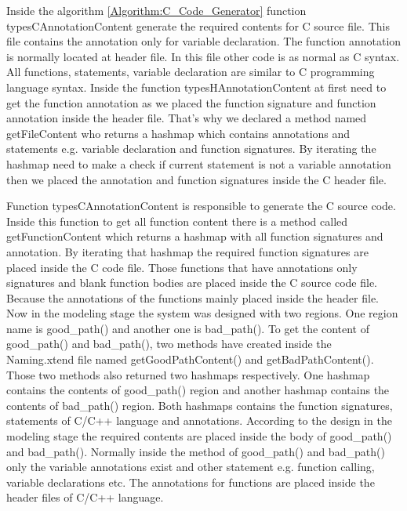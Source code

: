 Inside the algorithm \ref{Algorithm:C_Code_Generator} function typesCAnnotationContent generate the required contents for C source file. This file contains the annotation only for variable declaration. The function annotation is normally located at header file. In this file other code is as normal as C syntax. All functions, statements, variable declaration are similar to C programming language syntax. Inside the function typesHAnnotationContent at first need to get the function annotation as we placed the function signature and function annotation inside the header file. That's why we declared a method named getFileContent who returns a hashmap which contains annotations and statements e.g. variable declaration and function signatures. By iterating the hashmap need to make a check if current statement is not a variable annotation then we placed the annotation and function signatures inside the C header file.

Function typesCAnnotationContent is responsible to generate the C source code. Inside this function to get all function content there is a method called getFunctionContent which returns a hashmap with all function signatures and annotation. By iterating that hashmap the required function signatures are placed inside the C code file. Those functions that have annotations only signatures and blank function bodies are placed inside the C source code file. Because the annotations of the functions mainly placed inside the header file. Now in the modeling stage the system was designed with two regions. One region name is good\_path() and another one is bad\_path(). To get the content of good\_path() and bad\_path(), two methods have created inside the Naming.xtend file named getGoodPathContent() and getBadPathContent(). Those two methods also returned two hashmaps respectively. One hashmap contains the contents of good\_path() region and another hashmap contains the contents of bad\_path() region. Both hashmaps contains the function signatures, statements of C/C++ language and annotations. According to the design in the modeling stage the required contents are placed inside the body of good\_path() and bad\_path(). Normally inside the method of good\_path() and bad\_path() only the variable annotations exist and other statement e.g. function calling, variable declarations etc. The annotations for functions are placed inside the header files of C/C++ language. 

